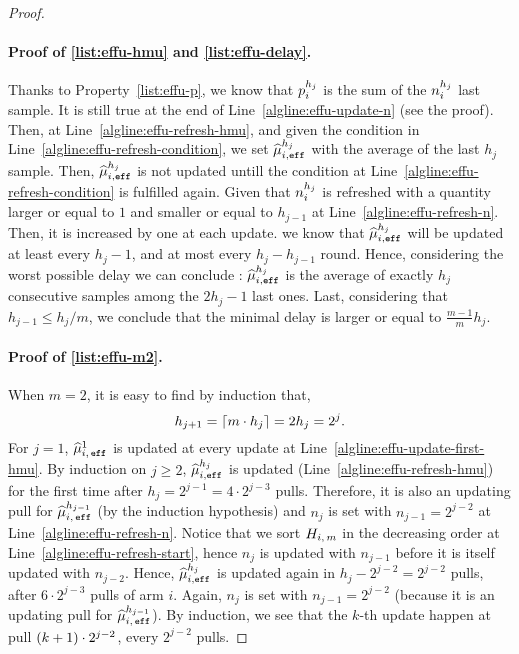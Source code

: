 \begin{proof}
\paragraph{Proof of \ref{list:effu-hmu} and \ref{list:effu-delay}.}
Thanks to Property~\ref{list:effu-p}, we know that $p_i^{h_j}$ is the sum of the $n_i^{h_j}$ last sample. It is still true at the end of Line~\ref{algline:effu-update-n} (see the proof). Then, at Line~\ref{algline:effu-refresh-hmu}, and given the condition in Line~\ref{algline:effu-refresh-condition}, we set $\widehat{\mu}_{i,\texttt{eff}}^{h_j}$ with the average of the last $h_j$ sample. Then, $\widehat{\mu}_{i,\texttt{eff}}^{h_j}$ is not updated untill the condition at Line~\ref{algline:effu-refresh-condition} is fulfilled again. Given that $n_i^{h_j}$ is refreshed with a quantity larger or equal to $1$ and smaller or equal to $h_{j-1}$ at Line~\ref{algline:effu-refresh-n}. Then, it is increased by one at each update. we know that $\widehat{\mu}_{i,\texttt{eff}}^{h_j}$ will be updated at least every $h_j-1$, and at most every $h_j -h_{j-1}$ round. Hence, considering the worst possible delay we can conclude : $\widehat{\mu}_{i,\texttt{eff}}^{h_j}$ is the average of exactly $h_j$ consecutive samples among the $2h_j -1$ last ones. Last, considering that $h_{j-1}\leq h_j /m$, we conclude that the minimal delay is larger or equal to $\frac{m-1}{m}h_j$.

\paragraph{Proof of \ref{list:effu-m2}.}
When $m=2$, it is easy to find by induction that,
 \[
 h_{j+1} = \left\lceil m\cdot h_j\right\rceil = 2h_j = 2^j.
 \]
For $j=1$, $\widehat{\mu}_{i,\,\texttt{eff}}^1$ is updated at every update at Line~\ref{algline:effu-update-first-hmu}.
By induction on $j\geq 2$, $\widehat{\mu}_{i,\texttt{eff}}^{h_j}$ is updated (Line~\ref{algline:effu-refresh-hmu}) for the first time after $h_j= 2^{j-1} = 4 \cdot 2^{j-3}$ pulls. Therefore, it is also an updating pull for $\widehat{\mu}_{i,\,\texttt{eff}}^{h_{j-1}}$ (by the induction hypothesis) and $n_j$ is set with $n_{j-1} = 2^{j-2}$ at Line~\ref{algline:effu-refresh-n}. Notice that we sort $H_{i,\,m}$ in the decreasing order at Line~\ref{algline:effu-refresh-start}, hence $n_j$ is updated with $n_{j-1}$ before it is itself updated with $n_{j-2}$.  Hence, $\widehat{\mu}_{i,\texttt{eff}}^{h_j}$ is updated again in $h_j - 2^{j-2} = 2^{j-2}$ pulls, \ie after $6 \cdot 2^{j-3}$ pulls of arm $i$. Again, $n_j$ is set with $n_{j-1} = 2^{j-2}$ (because it is an updating pull for $\widehat{\mu}_{i,\,\texttt{eff}}^{h_{j-1}}$). By induction, we see that the $k$-th update happen at pull $ \left(k+1\right) \cdot 2^{j-2}$, \ie every $2^{j-2}$ pulls.
\end{proof}


